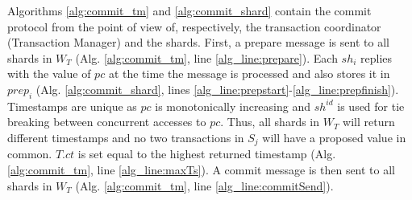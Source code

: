 \documentclass[sigplan,10pt]{acmart}
\begin{document}
\begin{algorithm}
	\label{alg:commit_shard}
\end{algorithm}

Algorithms \ref{alg:commit_tm} and \ref{alg:commit_shard} contain the commit protocol from the point of view of, respectively, the transaction coordinator (Transaction Manager) and the shards.
First, a prepare message is sent to all shards in $W_T$ (Alg. \ref{alg:commit_tm}, line \ref{alg_line:prepare}).
Each $\mathit{sh}_i$ replies with the value of $\mathit{pc}$ at the time the message is processed and also stores it in $\mathit{prep}_i$ (Alg. \ref{alg:commit_shard}, lines \ref{alg_line:prepstart}-\ref{alg_line:prepfinish}).
Timestamps are unique as $\mathit{pc}$ is monotonically increasing and $\mathit{sh^{id}}$ is used for tie breaking between concurrent accesses to $\mathit{pc}$.
Thus, all shards in $W_T$ will return different timestamps and no two transactions in $S_j$ will have a proposed value in common.
$\mathit{T.ct}$ is set equal to the highest returned timestamp (Alg. \ref{alg:commit_tm}, line \ref{alg_line:maxTs}).
A commit message is then sent to all shards in $W_T$ (Alg. \ref{alg:commit_tm}, line \ref{alg_line:commitSend}).
\end{document}
